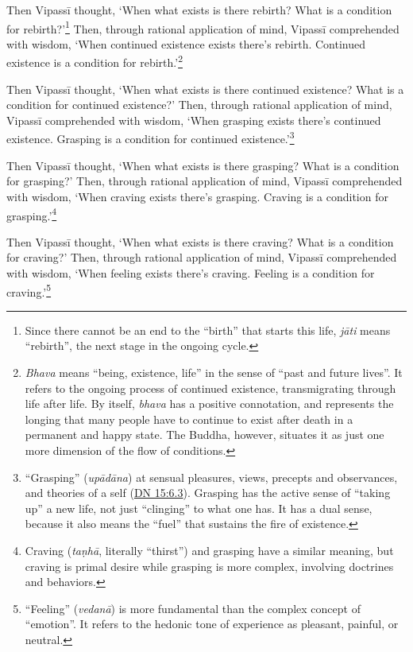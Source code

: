 \documentclass[12pt,openany]{book}%
\begin{document}
Then \textsanskrit{Vipassī} thought, ‘When what exists is there rebirth? What is a condition for rebirth?’\footnote{Since there cannot be an end to the “birth” that starts this life, \textit{\textsanskrit{jāti}} means “rebirth”, the next stage in the ongoing cycle. } Then, through rational application of mind, \textsanskrit{Vipassī} comprehended with wisdom, ‘When continued existence exists there’s rebirth. Continued existence is a condition for rebirth.’\footnote{\textit{Bhava} means “being, existence, life” in the sense of “past and future lives”. It refers to the ongoing process of continued existence, transmigrating through life after life. By itself, \textit{bhava} has a positive connotation, and represents the longing that many people have to continue to exist after death in a permanent and happy state. The Buddha, however, situates it as just one more dimension of the flow of conditions. } 

Then \textsanskrit{Vipassī} thought, ‘When what exists is there continued existence? What is a condition for continued existence?’ Then, through rational application of mind, \textsanskrit{Vipassī} comprehended with wisdom, ‘When grasping exists there’s continued existence. Grasping is a condition for continued existence.’\footnote{“Grasping” (\textit{\textsanskrit{upādāna}}) at sensual pleasures, views, precepts and observances, and theories of a self (\href{https://suttacentral.net/dn15/en/sujato\#6.3}{DN 15:6.3}). Grasping has the active sense of “taking up” a new life, not just “clinging” to what one has. It has a dual sense, because it also means the “fuel” that sustains the fire of existence. } 

Then \textsanskrit{Vipassī} thought, ‘When what exists is there grasping? What is a condition for grasping?’ Then, through rational application of mind, \textsanskrit{Vipassī} comprehended with wisdom, ‘When craving exists there’s grasping. Craving is a condition for grasping.’\footnote{Craving (\textit{\textsanskrit{taṇhā}}, literally “thirst”) and grasping have a similar meaning, but craving is primal desire while grasping is more complex, involving doctrines and behaviors. } 

Then \textsanskrit{Vipassī} thought, ‘When what exists is there craving? What is a condition for craving?’ Then, through rational application of mind, \textsanskrit{Vipassī} comprehended with wisdom, ‘When feeling exists there’s craving. Feeling is a condition for craving.’\footnote{“Feeling” (\textit{\textsanskrit{vedanā}}) is more fundamental than the complex concept of “emotion”. It refers to the hedonic tone of experience as pleasant, painful, or neutral. } 
\end{document}
